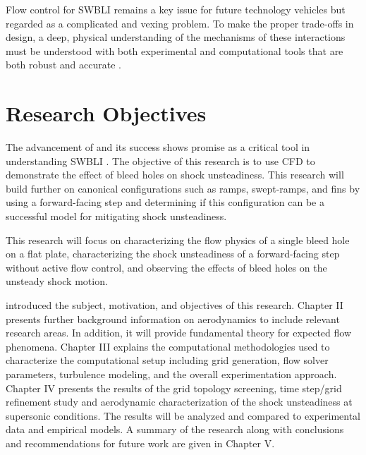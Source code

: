 Flow control for SWBLI remains a key issue for future technology vehicles but regarded as a complicated and vexing problem. To make the proper trade-offs in design, a deep, physical understanding of the mechanisms of these interactions must be understood with both experimental and computational tools that are both robust and accurate \cite{Dolling2001}.

\section{Research Objectives} 

The advancement of  and its success shows promise as a critical tool in understanding SWBLI \cite{Zha1998, Dolling2001}. The objective of this research is to use CFD to demonstrate the effect of bleed holes on shock unsteadiness. This research will build further on canonical configurations such as ramps, swept-ramps, and fins by using a forward-facing step and determining if this configuration can be a successful model for mitigating shock unsteadiness.

This research will focus on characterizing the flow physics of a single bleed hole on a flat plate, characterizing the shock unsteadiness of a forward-facing step without active flow control, and observing the effects of bleed holes on the unsteady shock motion.

 introduced the subject, motivation, and objectives of this research. 
Chapter II%
presents further background information on aerodynamics to include relevant research areas. In addition, it will provide fundamental theory for expected flow phenomena. 
Chapter III explains the computational methodologies used to characterize the computational setup including grid generation, flow solver parameters, turbulence modeling, and the overall experimentation approach. 
Chapter IV presents the results of the grid topology screening, time step/grid refinement study and aerodynamic characterization of the shock unsteadiness at supersonic conditions. The results will be analyzed and compared to experimental data and empirical models. A summary of the research along with conclusions and recommendations for future work are given in Chapter V.


